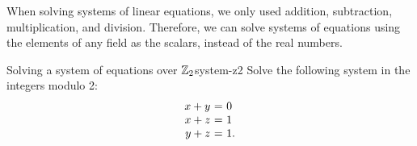 When solving systems of linear equations, we only used addition,
subtraction, multiplication, and division. Therefore, we can solve
systems of equations using the elements of any field as the scalars,
instead of the real numbers.

\begin{example}{Solving a system of equations over $\mathbb{Z}_2$}{system-z2}
  Solve the following system in the integers modulo 2:
  \begin{equation*}
    \begin{array}{r@{~}c@{~}l}
      x + y     &=& 0 \\
      x     + z &=& 1 \\
          y + z &=& 1.
    \end{array}
  \end{equation*}
\end{example}

